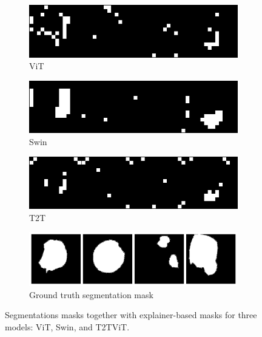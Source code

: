 \documentclass[magisterska,en]{pracamgr}
\begin{document}
\begin{figure}
\centering
\begin{subfigure}{0.55\textwidth}
   \includegraphics[width=1\linewidth]{./images/gastro_segmentation_vit_2.png}
   \caption{ViT}
   \label{fig:Ng2}
\end{subfigure}
\begin{subfigure}{0.55\textwidth}
   \includegraphics[width=1\linewidth]{./images/gastro_segmentation_swin_2.png}
   \caption{Swin}
   \label{fig:Ng2}
\end{subfigure}
\begin{subfigure}{0.55\textwidth}
   \includegraphics[width=1\linewidth]{./images/gastro_segmentation_t2t_vit_2.png}
   \caption{T2T}
   \label{fig:Ng2}
\end{subfigure}
\begin{subfigure}{0.55\textwidth}
   \includegraphics[width=1\linewidth]{./images/gastro_segmentation_2.png}
   \caption{Ground truth segmentation mask}
   \label{fig:Ng1}
\end{subfigure}
\caption{Segmentations masks together with explainer-based masks for three models: ViT, Swin, and T2T\textunderscore ViT.}
\label{segm_exp_2}
\end{figure}
\end{document}
